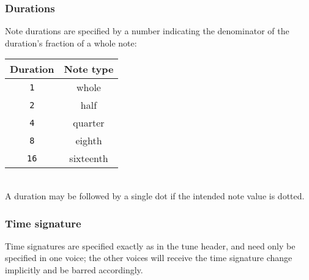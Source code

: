 \documentclass{article}
\begin{document}
\subsubsection*{Durations}

Note durations are specified by a number indicating the denominator of
the duration's fraction of a whole note:\\

\begin{tabular}{| c | c |}

  \hline
  \textbf{Duration} & \textbf{Note type}\\
  \hline
  \texttt{1} & whole\\
  \texttt{2} & half\\
  \texttt{4} & quarter\\
  \texttt{8} & eighth\\
  \texttt{16} & sixteenth\\
  \hline

\end{tabular}\\

\noindent
A duration may be followed by a single dot if the intended note value
is dotted.

\subsubsection*{Time signature}

Time signatures are specified exactly as in the tune header, and need
only be specified in one voice; the other voices will receive the time
signature change implicitly and be barred accordingly.
\end{document}
